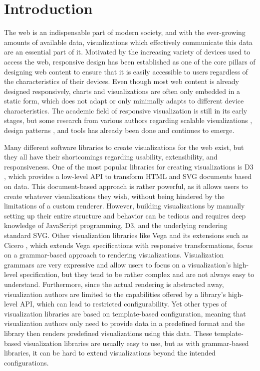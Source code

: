 \chapter{Introduction}
\label{chap:Introduction}

The web is an indispensable part of modern society, and with the
ever-growing amounts of available data, visualizations which
effectively communicate this data are an essential part of it.
Motivated by the increasing variety of devices used to access the web,
responsive design has been established as one of the core pillars of
designing web content to ensure that it is easily accessible to users
regardless of the characteristics of their devices. Even though most
web content is already designed responsively, charts and
visualizations are often only embedded in a static form, which does
not adapt or only minimally adapts to different device
characteristics. The academic field of responsive visualization is
still in its early stages, but some research from various authors
regarding scalable visualizations
\parencite{BuildingRespDataVisForTheWeb,LearningRespDataVis}, design
patterns
\parencite{RespVisTalk,RespVisPage,RespVis,TechniquesForFlexibleRespVisDesign,
  DesignPatternsTradeOffsRespVis}, and tools
\parencite{TechniquesForFlexibleRespVisDesign} has already been done
and continues to emerge.


Many different software libraries to create visualizations for the web
exist, but they all have their shortcomings regarding usability,
extensibility, and responsiveness. One of the most popular libraries
for creating visualizations is D3 \parencite{D3,D3JS}, which provides
a low-level API to transform HTML and SVG documents based on
data. This document-based approach is rather powerful, as it allows
users to create whatever visualizations they wish, without being
hindered by the limitations of a custom renderer. However, building
visualizations by manually setting up their entire structure and
behavior can be tedious and requires deep knowledge of JavaScript
programming, D3, and the underlying rendering standard SVG.
%
Other visualization libraries like Vega \parencite{Vega} and its
extensions such as Cicero \parencite{Cicero}, which extends Vega
specifications with responsive transformations, focus on a
grammar-based approach to rendering visualizations. Visualization
grammars are very expressive and allow users to focus on a
visualization's high-level specification, but they tend to be rather
complex and are not always easy to understand. Furthermore, since the
actual rendering is abstracted away, visualization authors are limited
to the capabilities offered by a library's high-level API, which can
lead to restricted configurability.
%
Yet other types of visualization libraries are based on template-based
configuration, meaning that visualization authors only need to provide
data in a predefined format and the library then renders predefined
visualizations using this data. These template-based visualization
libraries are usually easy to use, but as with grammar-based
libraries, it can be hard to extend visualizations beyond the intended
configurations.



